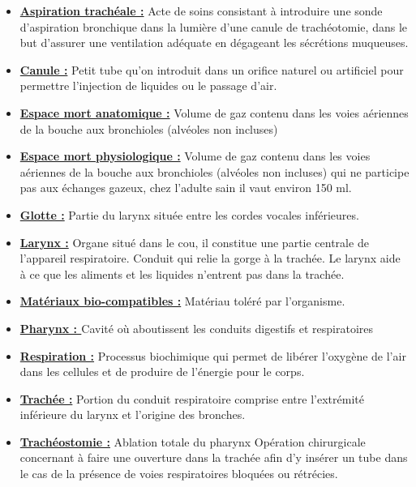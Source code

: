 \documentclass [11pt]{article}
\begin{document}
\begin{itemize}
\item
\textbf{\underline{Aspiration trachéale  :}} Acte de soins consistant à introduire une sonde d'aspiration bronchique dans la lumière d'une canule de trachéotomie, dans le but d'assurer une ventilation adéquate en dégageant les sécrétions muqueuses.

\item 
\textbf{\underline{Canule :}}  Petit tube qu'on introduit dans un orifice naturel ou artificiel pour permettre l'injection de liquides ou le passage d'air. 

\item 
\textbf{\underline{Espace mort anatomique :}} Volume de gaz contenu dans les voies aériennes de la bouche aux bronchioles (alvéoles non incluses)

\item 
\textbf{\underline{Espace mort physiologique :}} Volume de gaz contenu dans les voies aériennes de la bouche aux bronchioles (alvéoles non incluses) qui ne participe pas aux échanges gazeux, chez l'adulte sain il vaut environ 150 ml.

\item 
\textbf{\underline{Glotte :}} Partie du larynx située entre les cordes vocales inférieures.

\item 
\textbf{\underline{Larynx :}}  Organe situé dans le cou, il constitue une partie centrale de l'appareil respiratoire. Conduit qui relie la gorge à la trachée. Le larynx aide à ce que les aliments et les liquides n'entrent pas dans la trachée.

\item 
\textbf{\underline{Matériaux bio-compatibles :}} Matériau toléré par l'organisme.

\item 
\textbf{\underline{Pharynx : }}Cavité où aboutissent les conduits digestifs et respiratoires

\item 
\textbf{\underline{Respiration  :}} Processus biochimique qui permet de libérer l'oxygène de l'air dans les cellules et de produire de l'énergie pour le corps.

\item 
\textbf{\underline{Trachée :}} Portion du conduit respiratoire comprise entre l'extrémité inférieure du larynx et l'origine des bronches.

\item 
\textbf{\underline{Trachéostomie :}} Ablation totale du pharynx  Opération chirurgicale concernant à faire une ouverture dans la trachée afin d'y insérer un tube dans le cas de la présence de voies respiratoires bloquées ou rétrécies. 


\end{itemize}
\end{document}
